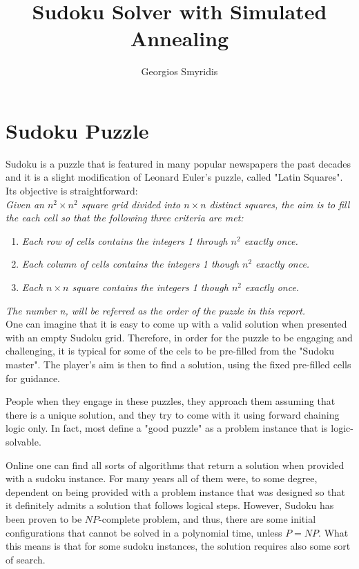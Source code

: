 \documentclass[11pt]{report}
\title{Sudoku Solver with Simulated Annealing}
\author{Georgios Smyridis}
\date{}
\begin{document}
\maketitle

\section*{Sudoku Puzzle}

Sudoku is a puzzle that is featured in many popular newspapers the past decades and it is a slight modification of Leonard Euler's puzzle, called "Latin Squares". Its objective is straightforward:
\\

\textit{Given an $n^2\times n^2$ square grid divided into $n\times n$ distinct squares, the aim is to fill the each cell so that the following three criteria are met:}
\begin{enumerate}
	\item \textit{Each row of cells contains the integers 1 through $n^2$ exactly once.}
	\item \textit{Each column of cells contains the integers 1 though $n^2$ exactly once.}
	\item \textit{Each $n\times n$ square contains the integers 1 though $n^2$ exactly once.}
\end{enumerate}
\textit{The number n, will be referred as the order of the puzzle in this report.}
\\

One can imagine that it is easy to come up with a valid solution when presented with an empty Sudoku grid. Therefore, in order for the puzzle to be engaging and challenging, it is typical for some of the cels to be pre-filled from the "Sudoku master". The player's aim is then to find a solution, using the fixed pre-filled cells for guidance.

People when they engage in these puzzles, they approach them assuming that there is a unique solution, and they try to come with it using forward chaining logic only. In fact, most define a "good puzzle" as a problem instance that is logic-solvable.

Online one can find all sorts of algorithms that return a solution when provided with a sudoku instance. For many years all of them were, to some degree, dependent on being provided with a problem instance that was designed so that it definitely admits a solution that follows logical steps. However, Sudoku has been proven to be $NP$-complete problem, and thus, there are some initial configurations that cannot be solved in a polynomial time, unless $P=NP$. What this means is that for some sudoku instances, the solution requires also some sort of search.
\end{document}

